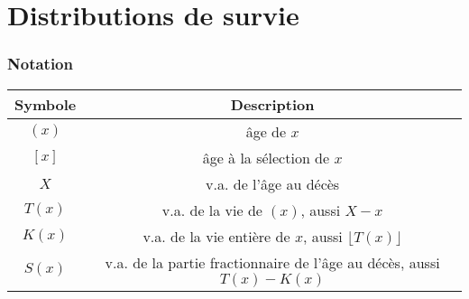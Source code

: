 \chapter{Distributions de survie}

\subsection{Notation}

\begin{center}
	\begin{tabular}{cc}
		\hline
		Symbole &                              Description                               \\ \hline
		$(x)$  &                               âge de $x$                               \\
		$[x]$  &                       âge à la sélection de $x$                        \\
		$X$   &                         v.a. de l'âge au décès                         \\
		$T(x)$  &                 v.a. de la vie de $(x)$, aussi $X - x$                 \\
		$K(x)$  &      v.a. de la vie entière de $x$, aussi $\lfloor T(x) \rfloor$       \\
		$S(x)$  & v.a. de la partie fractionnaire de l'âge au décès, aussi $T(x) - K(x)$ \\ \hline
	\end{tabular}
\end{center}

